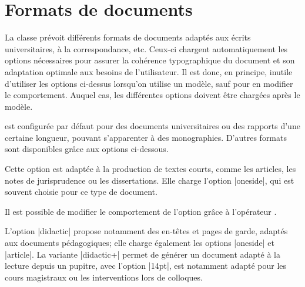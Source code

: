 
\section{Formats de documents}

La classe \frenchlaw prévoit différents formats de documents adaptés aux écrits universitaires, à la correspondance, etc. Ceux-ci chargent automatiquement les options nécessaires pour assurer la cohérence typographique du document et son adaptation optimale aux besoins de l'utilisateur. Il est donc, en principe, inutile d'utiliser les options ci-dessus lorsqu'on utilise un modèle, sauf pour en modifier le comportement. Auquel cas, les différentes options doivent être chargées après le modèle.

\frenchlaw est configurée par défaut pour des documents universitaires ou des rapports d'une certaine longueur, pouvant s'apparenter à des monographies. D'autres formats sont disponibles grâce aux options ci-dessous.

Cette option est adaptée à la production de textes courts, comme les articles, les notes de jurisprudence ou les dissertations. Elle charge l'option |oneside|, qui est souvent choisie pour ce type de document.

\begin{developer}
Il est possible de modifier le comportement de l'option grâce à l'opérateur .
\end{developer} 

\begin{noprint}
\end{noprint}

L'option |didactic| propose notamment des en-têtes et pages de garde, adaptés aux documents pédagogiques; elle charge également les options |oneside| et |article|. La variante |didactic+| permet de générer un document adapté à la lecture depuis un pupitre, avec l'option |14pt|, est notamment adapté pour les cours magistraux ou les interventions lors de colloques.

